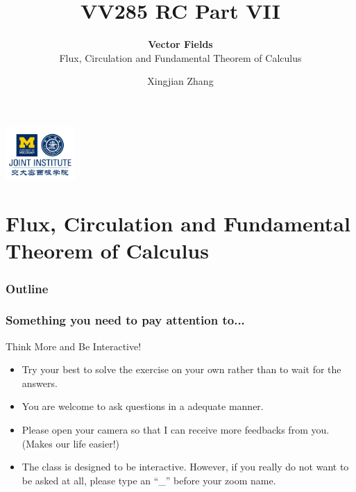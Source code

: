 \documentclass[11pt, t]{beamer}
\title{VV285 RC Part VII}
\subtitle{\textbf{Vector Fields}\\\large Flux, Circulation and Fundamental Theorem of Calculus}
\institute[UM-SJTU JI]{Univerity of Michigan-Shanghai Jiao Tong University Joint Institute}
\author{Xingjian Zhang}
\begin{document}
\begin{frame}
    \titlepage
    \begin{center}
        \includegraphics[height=2cm]{logo2.png}
    \end{center}
\end{frame}

\section{Flux, Circulation and Fundamental Theorem of Calculus}
\begin{frame}
    \frametitle{Outline}
    \begin{spacing}{1.2}
        \tableofcontents[currentsubsection,hideothersubsections,sectionstyle=hide]
    \end{spacing}
\end{frame}

\begin{frame}
    \frametitle{Something you need to pay attention to...}
    Think More and Be Interactive!
    \begin{itemize}
        \item Try your best to solve the exercise on your own rather than to wait for the answers.
        \item You are welcome to ask questions in a adequate manner.
        \item Please open your camera so that I can receive more feedbacks from you. (Makes our life easier!)
        \item The class is designed to be interactive. However, if you really do not want to be asked at all, please type an ``\_'' before your zoom name.
    \end{itemize}
\end{frame}
\end{document}
